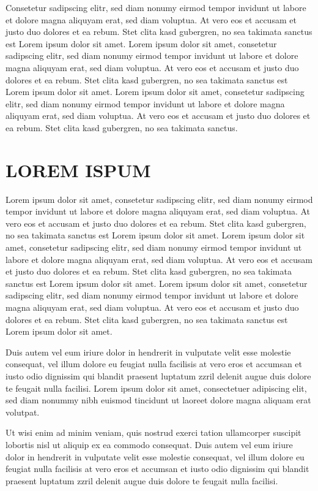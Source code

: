 \documentclass[]{../metanetpaper}
\begin{document}
Consetetur sadipscing elitr, sed diam nonumy eirmod tempor invidunt ut labore et dolore magna aliquyam erat, sed diam voluptua. At vero eos et accusam et justo duo dolores et ea rebum. Stet clita kasd gubergren, no sea takimata sanctus est Lorem ipsum dolor sit amet. Lorem ipsum dolor sit amet, consetetur sadipscing elitr, sed diam nonumy eirmod tempor invidunt ut labore et dolore magna aliquyam erat, sed diam voluptua. At vero eos et accusam et justo duo dolores et ea rebum. Stet clita kasd gubergren, no sea takimata sanctus est Lorem ipsum dolor sit amet. Lorem ipsum dolor sit amet, consetetur sadipscing elitr, sed diam nonumy eirmod tempor invidunt ut labore et dolore magna aliquyam erat, sed diam voluptua. At vero eos et accusam et justo duo dolores et ea rebum. Stet clita kasd gubergren, no sea takimata sanctus.   
\section{LOREM ISPUM}
Lorem ipsum dolor sit amet, consetetur sadipscing elitr, sed diam nonumy eirmod tempor invidunt ut labore et dolore magna aliquyam erat, sed diam voluptua. At vero eos et accusam et justo duo dolores et ea rebum. Stet clita kasd gubergren, no sea takimata sanctus est Lorem ipsum dolor sit amet. Lorem ipsum dolor sit amet, consetetur sadipscing elitr, sed diam nonumy eirmod tempor invidunt ut labore et dolore magna aliquyam erat, sed diam voluptua. At vero eos et accusam et justo duo dolores et ea rebum. Stet clita kasd gubergren, no sea takimata sanctus est Lorem ipsum dolor sit amet. Lorem ipsum dolor sit amet, consetetur sadipscing elitr, sed diam nonumy eirmod tempor invidunt ut labore et dolore magna aliquyam erat, sed diam voluptua. At vero eos et accusam et justo duo dolores et ea rebum. Stet clita kasd gubergren, no sea takimata sanctus est Lorem ipsum dolor sit amet.   

Duis autem vel eum iriure dolor in hendrerit in vulputate velit esse molestie consequat, vel illum dolore eu feugiat nulla facilisis at vero eros et accumsan et iusto odio dignissim qui blandit praesent luptatum zzril delenit augue duis dolore te feugait nulla facilisi. Lorem ipsum dolor sit amet, consectetuer adipiscing elit, sed diam nonummy nibh euismod tincidunt ut laoreet dolore magna aliquam erat volutpat.   

Ut wisi enim ad minim veniam, quis nostrud exerci tation ullamcorper suscipit lobortis nisl ut aliquip ex ea commodo consequat. Duis autem vel eum iriure dolor in hendrerit in vulputate velit esse molestie consequat, vel illum dolore eu feugiat nulla facilisis at vero eros et accumsan et iusto odio dignissim qui blandit praesent luptatum zzril delenit augue duis dolore te feugait nulla facilisi.   
\end{document}
